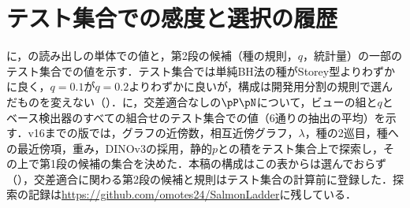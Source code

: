 \begin{table}[htbp]
\centering
\caption{第1段の候補（ビューと$q$；[\%]，交差適合なしの$\pP\pN$，単体，5通りの抽出の平均）．\textcolor{sotacol}{$\bigstar$}は列の最良値．}
\label{tab:sel}
\vspace{1.5mm}

\end{table}

\begin{table}[htbp]
\centering
\caption{第2段の候補（交差適合の種の規則・$q$・統計量；[\%]，$\pfin$，単体，5通りの抽出の平均）と参照．\textcolor{sotacol}{$\bigstar$}は列の最良値．}
\label{tab:selq}
\vspace{1.5mm}

\end{table}

\section{テスト集合での感度と選択の履歴}
\label{sec:app_sens}
に，の読み出しの単体での値と，第2段の候補（種の規則，$q$，統計量）の一部のテスト集合での値を示す．テスト集合では単純BH法の種がStorey型よりわずかに良く，$q{=}0.1$が$q{=}0.2$よりわずかに良いが，構成は開発用分割の規則で選んだものを変えない（）．に，交差適合なしの$\pP\pN$について，ビューの組と$q$とベース検出器のすべての組合せのテスト集合での値（6通りの抽出の平均）を示す．v16までの版では，グラフの近傍数，相互近傍グラフ，$\lambda$，種の2巡目，種への最近傍項，重み，DINOv3の採用，静的$p$との積をテスト集合上で探索し，その上で第1段の候補の集合を決めた．本稿の構成はこの表からは選んでおらず（），交差適合に関わる第2段の候補と規則はテスト集合の計算前に登録した．探索の記録は\url{https://github.com/omotes24/SalmonLadder}に残している．

\begin{table}[htbp]
\centering
\caption{同じ特徴での読み出しの比較（単体）と第2段の他の候補の値（[\%]，6通りの抽出の平均）．記法はと同じ．}
\label{tab:ablx}
\vspace{1.5mm}

\end{table}

\begin{table}[htbp]
\centering
\caption{テスト集合での感度（[\%]，交差適合なしの$\pP\pN$，6通りの抽出の平均）．\textcolor{sotacol}{$\bigstar$}は列の最良値．}
\label{tab:sens}
\vspace{1.5mm}

\end{table}

